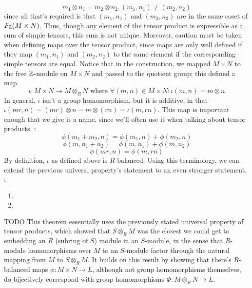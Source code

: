 \documentclass{article}
\begin{document}
$$ m_1 \otimes n_1 = m_2 \otimes n_2, (m_1, n_1) \neq (m_2, n_2) $$
since all that's required is that $ (m_1, n_1) $ and $ (m_2, n_2) $ are in the same coset of $ F_{\mathbb{Z}}(M \times N) $. Thus, though any element of the tensor product is expressible as a sum of simple tensors, this sum is not unique. Moreover, caution must be taken when defining maps over the tensor product, since maps are only well defined if they map $ (m_1, n_1) $ and $ (m_2, n_2) $ to the same element if the corresponding simple tensors are equal.
\n
Notice that in the construction, we mapped $ M \times N $ to the free $ \mathbb{Z} $-module on $ M \times N $ and passed to the quotient group; this defined a map
$$ \iota: M \times N \rightarrow M \otimes_R N \text{ where } \forall (m, n) \in M \times N: \iota(m, n) = m \otimes n $$
In general, $ \iota $ isn't a group homomorphism, but it is additive, in that $ \iota(m r, n) = (m r) \otimes n = m \otimes (r n) = \iota(m, r n) $. This map is important enough that we give it a name, since we'll often use it when talking about tensor products.
\nn
{}: 
$$ \phi(m_1 + m_2, n) = \phi(m_1, n) + \phi(m_2, n) $$
$$ \phi(m, n_1 + n_2) = \phi(m, n_1) + \phi(m, n_2) $$
$$ \phi(m r, n) = \phi(m, r n) $$
\indent {}
\nn
By definition, $ \iota $ as defined above is $ R $-balanced. Using this terminology, we can extend the previous univeral property's statement to an even stronger statement.
\nn
{}: 
\begin{enumerate}
    \item {}
    \item {}
\end{enumerate}
\Pf TODO
\In This theorem essentially uses the previously stated universal property of tensor products, which showed that $ S \otimes_R M $ was the closest we could get to embedding an $ R $ (subring of $ S $) module in an $ S $-module, in the sense that $ R $-module homomorphisms over $ M $ to an $ S $-module factor through the natural mapping from $ M $ to $ S \otimes_R M $. It builds on this result by showing that there's $ R $-balanced maps $ \phi: M \times N \rightarrow L $, although not group homomorphisms themselves, do bijectively correspond with group homomorphisms $ \Phi: M \otimes_R N \rightarrow L $.
\end{document}
